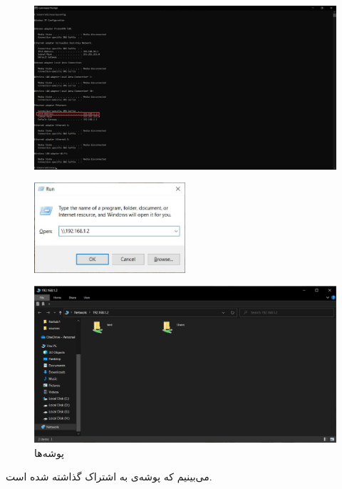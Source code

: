 \documentclass{article}
\begin{document}
\begin{figure}[H]
    \centering
    \includegraphics[width=1.0\textwidth]{figures/2.6.jpg}
    \caption
	{
	}
    \label{fig:fig1}
\end{figure}

\begin{figure}[H]
    \centering
    \includegraphics[width=0.5\textwidth]{figures/2.7.jpg}
    \caption
	{
	}
    \label{fig:fig1}
\end{figure}

\begin{figure}[H]
    \centering
    \includegraphics[width=1.0\textwidth]{figures/2.8.jpg}
    \caption
	{
پوشه‌ها
	}
    \label{fig:fig1}
\end{figure}
می‌بینیم که پوشه‌ی  به اشتراک گذاشته شده است.
\end{document}
